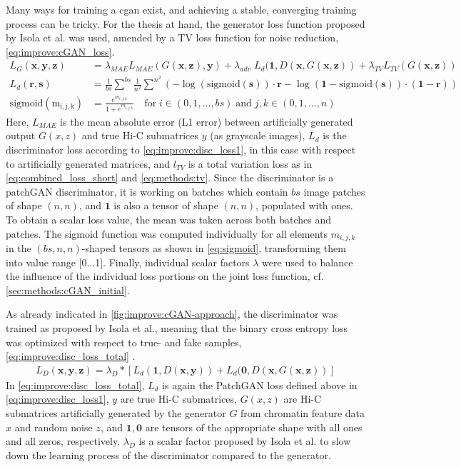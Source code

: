 Many ways for training a \acrshort{cgan} exist, and achieving a stable, converging training process can be tricky.
For the thesis at hand, the generator loss function proposed by Isola et al. \cite{Isola2017} was used, 
amended by a TV loss function for noise reduction, \cref{eq:improve:cGAN_loss}.
\begin{align}
 L_G(\mathbf{x}, \mathbf{y}, \mathbf{z}) &=\lambda_\mathit{MAE}L_\mathit{MAE}(G(\mathbf{x},\mathbf{z}), \mathbf{y}) + \lambda_\mathit{adv} \; L_d(\mathbf{1}, D(\mathbf{x}, G(\mathbf{x},\mathbf{z})) +  \lambda_\mathit{TV}L_\mathit{TV}(G(\mathbf{x},\mathbf{z})) \label{eq:improve:cGAN_loss}\\
 L_d(\mathbf{r, s}) &= \frac{1}{bs}\sum^{bs} \frac{1}{n^2}\sum^{n^2}\left( -\log(\mathrm{sigmoid}(\mathbf{s})) \cdot \mathbf{r} - \log(\mathbf{1} - \mathrm{sigmoid}(\mathbf{s})) \cdot (\mathbf{1} - \mathbf{r}) \right) \label{eq:improve:disc_loss1}\\
 \mathrm{sigmoid(m_{i,j,k})} &= \frac{e^{m_{i,j,k}}}{1+e^{m_{i,j,k}}} \quad \mathrm{for}\; i \in (0, 1, \dots, bs)\; \textrm{and}\; j,k \in (0, 1, \dots, n) \label{eq:sigmoid}
\end{align}
Here, $L_\mathit{MAE}$ is the mean absolute error (L1 error) between artificially generated output $G(x,z)$ and true Hi-C submatrices $y$ (as grayscale images), 
$L_d$ is the discriminator loss according to \cref{eq:improve:disc_loss1}, in this case with respect to artificially generated matrices, and 
$l_\mathit{TV}$ is a total variation loss as in \cref{eq:combined_loss_short} and \cref{eq:methods:tv}.
Since the discriminator is a patchGAN discriminator, it is working on batches which contain $bs$ image patches of shape $(n,n)$, and $\mathbf{1}$ is also a tensor of shape $(n,n)$, populated with ones.
To obtain a scalar loss value, the mean was taken across both batches and patches. 
The sigmoid function was computed individually for all elements $m_{i,j,k}$ in the $(bs,n,n)$-shaped tensors as shown in \cref{eq:sigmoid}, transforming them into value range [0...1].
Finally, individual scalar factors $\lambda$ were used to balance the influence of the individual loss portions on the joint loss function, cf. \cref{sec:methods:cGAN_initial}.

As already indicated in \cref{fig:improve:cGAN-approach}, the discriminator was trained as proposed by Isola et al.,
meaning that the binary cross entropy loss was optimized with respect to true- and fake samples, \cref{eq:improve:disc_loss_total} .
\begin{align}
 L_D(\mathbf{x,y,z}) = \lambda_D * \left[ L_d(\mathbf{1}, D(\mathbf{x,y})) + L_d(\mathbf{0}, D(\mathbf{x},G(\mathbf{x, z})) \right] \label{eq:improve:disc_loss_total}
\end{align}
In \cref{eq:improve:disc_loss_total}, $L_d$ is again the PatchGAN loss defined above in \cref{eq:improve:disc_loss1}, $y$ are true Hi-C submatrices, 
$G(x,z)$ are Hi-C submatrices artificially generated by the generator $G$
from chromatin feature data $x$ and random noise $z$, and $\mathbf{1}, \mathbf{0}$ are tensors of the appropriate shape with all ones and all zeros, respectively.
$\lambda_D$ is a scalar factor proposed by Isola et al. to slow down the learning process of the discriminator compared to the generator.

